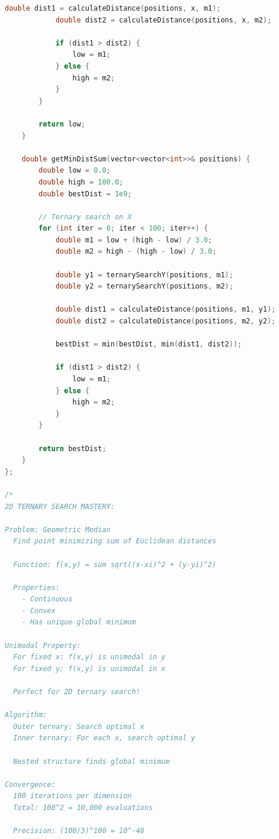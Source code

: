 \documentclass[11pt,a4paper,oneside]{book}
\begin{document}
\begin{lstlisting}[language=C++, caption=COMPLETE Coordinate BS Solutions - DETAILED]
            double dist1 = calculateDistance(positions, x, m1);
            double dist2 = calculateDistance(positions, x, m2);
            
            if (dist1 > dist2) {
                low = m1;
            } else {
                high = m2;
            }
        }
        
        return low;
    }
    
    double getMinDistSum(vector<vector<int>>& positions) {
        double low = 0.0;
        double high = 100.0;
        double bestDist = 1e9;
        
        // Ternary search on X
        for (int iter = 0; iter < 100; iter++) {
            double m1 = low + (high - low) / 3.0;
            double m2 = high - (high - low) / 3.0;
            
            double y1 = ternarySearchY(positions, m1);
            double y2 = ternarySearchY(positions, m2);
            
            double dist1 = calculateDistance(positions, m1, y1);
            double dist2 = calculateDistance(positions, m2, y2);
            
            bestDist = min(bestDist, min(dist1, dist2));
            
            if (dist1 > dist2) {
                low = m1;
            } else {
                high = m2;
            }
        }
        
        return bestDist;
    }
};

/*
2D TERNARY SEARCH MASTERY:

Problem: Geometric Median
  Find point minimizing sum of Euclidean distances
  
  Function: f(x,y) = sum sqrt((x-xi)^2 + (y-yi)^2)
  
  Properties:
    - Continuous
    - Convex
    - Has unique global minimum

Unimodal Property:
  For fixed x: f(x,y) is unimodal in y
  For fixed y: f(x,y) is unimodal in x
  
  Perfect for 2D ternary search!

Algorithm:
  Outer ternary: Search optimal x
  Inner ternary: For each x, search optimal y
  
  Nested structure finds global minimum

Convergence:
  100 iterations per dimension
  Total: 100^2 = 10,000 evaluations
  
  Precision: (100/3)^100 = 10^-48


\end{lstlisting}
\end{document}
